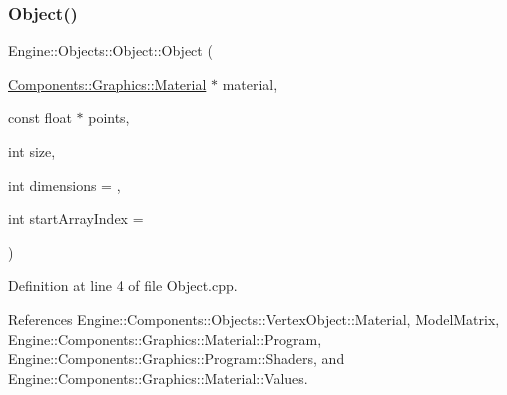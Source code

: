 \subsubsection{\texorpdfstring{Object()}{Object()}\hspace{0.1cm}{\footnotesize\ttfamily [1/2]}}
{\footnotesize\ttfamily Engine\+::\+Objects\+::\+Object\+::\+Object (\begin{DoxyParamCaption}\item[{\mbox{\hyperlink{classEngine_1_1Components_1_1Graphics_1_1Material}{Components\+::\+Graphics\+::\+Material}} $\ast$}]{material,  }\item[{const float $\ast$}]{points,  }\item[{int}]{size,  }\item[{int}]{dimensions = {},  }\item[{int}]{start\+Array\+Index = {} }\end{DoxyParamCaption})}



Definition at line 4 of file Object.\+cpp.



References Engine\+::\+Components\+::\+Objects\+::\+Vertex\+Object\+::\+Material, Model\+Matrix, Engine\+::\+Components\+::\+Graphics\+::\+Material\+::\+Program, Engine\+::\+Components\+::\+Graphics\+::\+Program\+::\+Shaders, and Engine\+::\+Components\+::\+Graphics\+::\+Material\+::\+Values.


